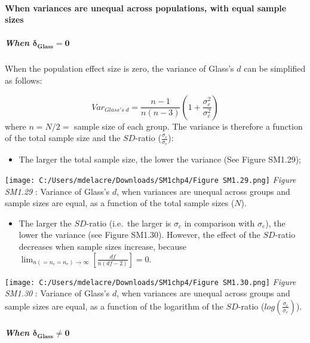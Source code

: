 \documentclass[
  english,
  man,mask,floatsintext]{apa6}
\providecommand{\tightlist}{%
  \setlength{\itemsep}{0pt}\setlength{\parskip}{0pt}}
\let\oldparagraph\paragraph
\renewcommand{\paragraph}[1]{\oldparagraph{#1}\mbox{}}
\let\oldsubparagraph\subparagraph
\renewcommand{\subparagraph}[1]{\oldsubparagraph{#1}\mbox{}}
\begin{document}
\hypertarget{when-variances-are-unequal-across-populations-with-equal-sample-sizes-2}{%
\paragraph{When variances are unequal across populations, with equal sample sizes}\label{when-variances-are-unequal-across-populations-with-equal-sample-sizes-2}}

\hypertarget{when-bmdelta_glass-0}{%
\subparagraph{\texorpdfstring{When \(\bm{\delta_{Glass} = 0}\)}{When \textbackslash bm\{\textbackslash delta\_\{Glass\} = 0\}}}\label{when-bmdelta_glass-0}}

When the population effect size is zero, the variance of Glass's \(d\) can be simplified as follows:

\[Var_{Glass's \; d} = \frac{n-1}{n(n-3)} \left( 1+\frac{\sigma^2_e}{\sigma^2_c}\right)\]
where \(n=N/2=\) sample size of each group. The variance is therefore a function of the total sample size and the \(SD\)-ratio (\(\frac{\sigma_c}{\sigma_e}\)):

\begin{itemize}
\tightlist
\item
  The larger the total sample size, the lower the variance (See Figure SM1.29);
\end{itemize}

\texttt{[image: C:/Users/mdelacre/Downloads/SM1chp4/Figure SM1.29.png]}
\emph{Figure SM1.29} : Variance of Glass's \(d\), when variances are unequal across groups and sample sizes are equal, as a function of the total sample sizes (\(N\)).

\begin{itemize}
\tightlist
\item
  The larger the \(SD\)-ratio (i.e.~the larger is \(\sigma_c\) in comparison with \(\sigma_e\)), the lower the variance (see Figure SM1.30). However, the effect of the \(SD\)-ratio decreases when sample sizes increase, because \(\lim_{n(=n_c=n_e)\rightarrow \infty}\left[\frac{df}{n(df-2)} \right]=0\).
\end{itemize}

\texttt{[image: C:/Users/mdelacre/Downloads/SM1chp4/Figure SM1.30.png]}
\emph{Figure SM1.30} : Variance of Glass's \(d\), when variances are unequal across groups and sample sizes are equal, as a function of the logarithm of the \(SD\)-ratio (\(log \left( \frac{\sigma_c}{\sigma_e} \right)\)).

\hypertarget{when-bmdelta_glass-neq-0-1}{%
\subparagraph{\texorpdfstring{When \(\bm{\delta_{Glass} \neq 0}\)}{When \textbackslash bm\{\textbackslash delta\_\{Glass\} \textbackslash neq 0\}}}\label{when-bmdelta_glass-neq-0-1}}
\end{document}
